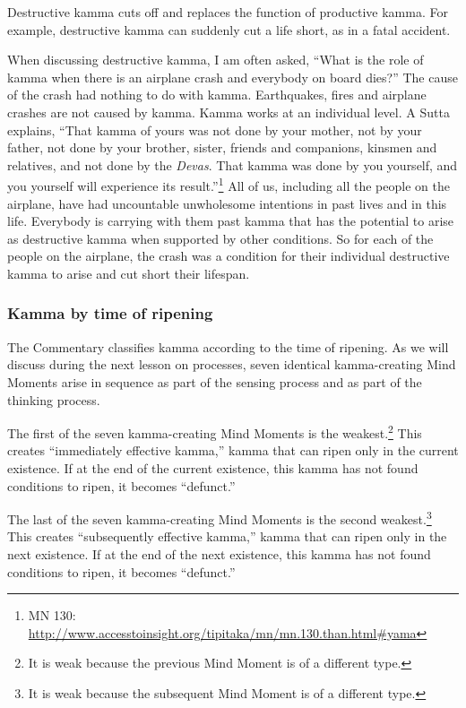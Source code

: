 Destructive kamma cuts off and replaces the function of productive kamma. For example, destructive kamma can suddenly cut a life short, as in a fatal accident.

When discussing destructive kamma, I am often asked, “What is the role of kamma when there is an airplane crash and everybody on board dies?” The cause of the crash had nothing to do with kamma. Earthquakes, fires and airplane crashes are not caused by kamma. Kamma works at an individual level. A Sutta explains, “That kamma of yours was not done by your mother, not by your father, not done by your brother, sister, friends and companions, kinsmen and relatives, and not done by the \textit{Devas}. That kamma was done by you yourself, and you yourself will experience its result.”\footnote{MN 130: \url{http://www.accesstoinsight.org/tipitaka/mn/mn.130.than.html\#yama}} All of us, including all the people on the airplane, have had uncountable unwholesome intentions in past lives and in this life. Everybody is carrying with them past kamma that has the potential to arise as destructive kamma when supported by other conditions. So for each of the people on the airplane, the crash was a condition for their individual destructive kamma to arise and cut short their lifespan.

\pagebreak

\subsubsection*{Kamma by time of ripening}

The Commentary classifies kamma according to the time of ripening. As we will discuss during the next lesson on processes, seven identical kamma-creating Mind Moments arise in sequence as part of the sensing process and as part of the thinking process.

The first of the seven kamma-creating Mind Moments is the weakest.\footnote{It is weak because the previous Mind Moment is of a different type.} This creates “immediately effective kamma,” kamma that can ripen only in the current existence. If at the end of the current existence, this kamma has not found conditions to ripen, it becomes “defunct.”

The last of the seven kamma-creating Mind Moments is the second weakest.\footnote{It is weak because the subsequent Mind Moment is of a different type.} This creates “subsequently effective kamma,” kamma that can ripen only in the next existence. If at the end of the next existence, this kamma has not found conditions to ripen, it becomes “defunct.”

